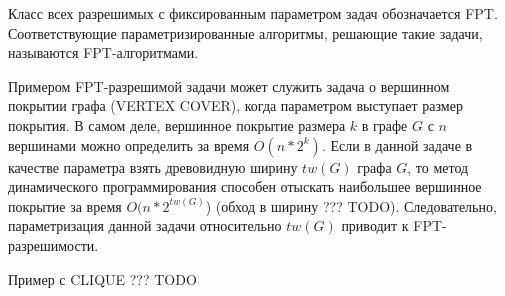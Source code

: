     \begin{Rem}
        Класс всех разрешимых с фиксированным параметром задач обозначается FPT. Соответствующие параметризированные алгоритмы, решающие такие задачи, называются FPT-алгоритмами.
    \end{Rem}
    \begin{Example}
        Примером FPT-разрешимой задачи может служить задача о вершинном покрытии графа (VERTEX COVER), когда параметром выступает размер покрытия. В самом деле, вершинное покрытие размера $k$ в графе $G$ с $n$ вершинами можно определить за время $O(n*2^k)$. Если в данной задаче в качестве параметра взять древовидную ширину $tw(G)$ графа $G$, то метод динамического программирования способен отыскать наибольшее вершинное покрытие за время $O(n * 2^{tw(G)}$) (обход в ширину ??? TODO). Следовательно, параметризация данной задачи относительно $tw(G)$ приводит к FPT-разрешимости.
    \end{Example}
    \begin{Example}
        Пример с CLIQUE ??? TODO
    \end{Example}


